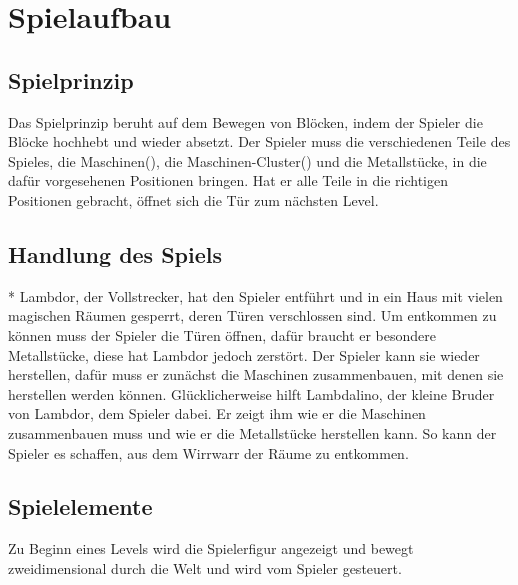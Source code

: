 \documentclass{scrartcl}
\begin{document}

\section{Spielaufbau}

\subsection{Spielprinzip}
Das Spielprinzip beruht auf dem Bewegen von Blöcken, indem der Spieler die Blöcke hochhebt und wieder absetzt. Der Spieler muss die verschiedenen Teile des Spieles, die Maschinen(), die Maschinen-Cluster() und die Metallstücke, in die dafür vorgesehenen Positionen bringen. Hat er alle Teile in die richtigen Positionen gebracht, öffnet sich die Tür zum nächsten Level.

\subsection{Handlung des Spiels}* \label{subsection:Story}
Lambdor, der Vollstrecker, hat den Spieler entführt und in ein Haus mit vielen magischen Räumen gesperrt, deren Türen verschlossen sind. Um entkommen zu können muss der Spieler die Türen öffnen, dafür braucht er besondere Metallstücke, diese hat Lambdor jedoch zerstört. Der Spieler kann sie wieder herstellen, dafür muss er zunächst die Maschinen zusammenbauen, mit denen sie herstellen werden können. Glücklicherweise hilft Lambdalino, der kleine Bruder von Lambdor, dem Spieler dabei. Er zeigt ihm wie er die Maschinen zusammenbauen muss und wie er die Metallstücke herstellen kann. So kann der Spieler es schaffen, aus dem Wirrwarr der Räume zu entkommen.


\subsection{Spielelemente}

Zu Beginn eines Levels wird die Spielerfigur angezeigt und bewegt zweidimensional durch die Welt und wird vom Spieler gesteuert.
\end{document}
